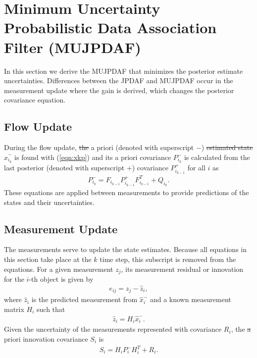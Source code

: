 \documentclass[letterpaper, 10pt, conference]{ieeeconf}
\newcommand{\refeqn}[1]{(\ref{eqn:#1})}
\providecommand{\DIFadd}[1]{{\protect\color{blue}\uwave{#1}}} %
\providecommand{\DIFdel}[1]{{\protect\color{red}\sout{#1}}}                      %
\providecommand{\DIFaddbegin}{} %
\providecommand{\DIFaddend}{} %
\providecommand{\DIFdelbegin}{} %
\providecommand{\DIFdelend}{} %
\begin{document}
\section{Minimum Uncertainty Probabilistic Data Association Filter (MUJPDAF)}
\label{MUJPDAF}

In this section we derive the MUJPDAF that minimizes the posterior estimate uncertainties.
Differences between the JPDAF and MUJPDAF occur in the measurement update where the gain is derived, which changes the posterior covariance equation.

\subsection{Flow Update}

During the flow update, \DIFdelbegin \DIFdel{the }\DIFdelend a priori (denoted with \DIFaddbegin \DIFadd{the }\DIFaddend superscript $-$) \DIFdelbegin \DIFdel{estimated state }\DIFdelend \DIFaddbegin \DIFadd{estimate }\DIFaddend $\hat x_{i_k}^-$ is found with \refeqn{xkp} and its a priori covariance $P_{i_k}^-$ is calculated from the last posterior (denoted with superscript $+$) covariance $P_{i_{k-1}}^+$ for all $i$ as
\begin{gather}
P_{i_{k}}^- = F_{i_{k-1}} P_{i_{k-1}}^+ F_{i_{k-1}}^T + Q_{i_{k}}.
\end{gather}
These equations are applied between measurements to provide predictions of the states and their uncertainties.

\subsection{Measurement Update}

The measurements serve to update the state estimates. Because all equations in this section take place at the $k$ time step, this subscript is removed from the equations. For a given measurement $z_j$, its measurement residual or innovation for the $i$-th object is given by
\begin{align}
e_{ij} = z_j - \hat z_i,\label{eqn:eij}
\end{align}
where $\hat z_i$ is the predicted measurement from $\hat x_{i}^-$ and a known measurement matrix $H_i$ such that
\begin{align}
\hat z_i = H_i\hat x_{i}^-.
\end{align}
Given the uncertainty of the measurements represented with covariance $R_i$, the \DIFdelbegin \DIFdel{a }\DIFdelend priori innovation covariance $S_{i}$ is
\begin{align}
S_{i}=H_{i}P_{i}^{-}H_{i}^T+R_{i}.\label{eqn:S}
\end{align}
\end{document}
